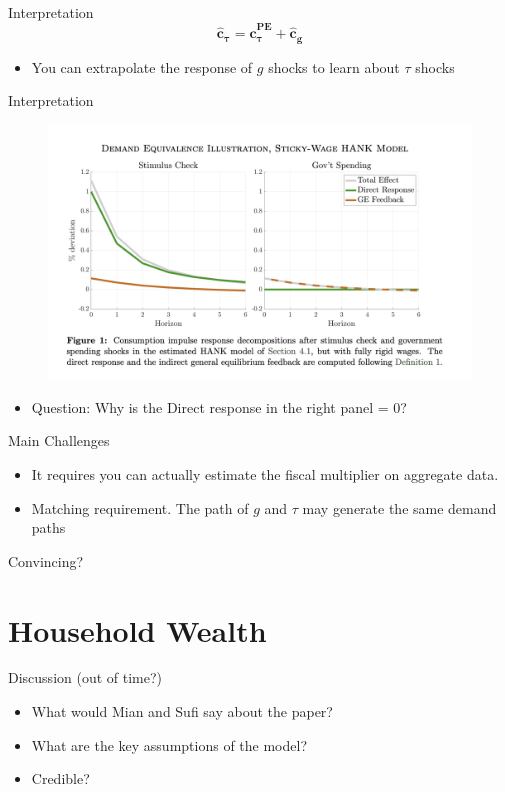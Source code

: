 \documentclass[english,xcolor=svgnames]{beamer}
\begin{document}
\begin{frame}{Interpretation}
$$\mathbf{\hat{c}_{\tau} = \hat{c}^{PE}_{\tau}  + \hat{c}_g} $$
\begin{itemize}
\item You can extrapolate the response of $g$ shocks to learn about $\tau$ shocks
\end{itemize}
\end{frame}

\begin{frame}{Interpretation}
\begin{figure}
\includegraphics[scale=0.45]{figures/wolf_1}
\end{figure}
\begin{itemize}
\item Question: Why is the Direct response in the right panel = 0?
\end{itemize}
\end{frame}

\begin{frame}{Main Challenges}
\begin{itemize}
\item It requires you can actually estimate the fiscal multiplier on aggregate data.
\item Matching requirement. The path of $g$ and $\tau$ may generate the same demand paths
\end{itemize}
\end{frame}

\begin{frame}{Convincing?}

\end{frame}


\section{Household Wealth}

\begin{frame}{Discussion (out of time?)}
\begin{itemize}
\item What would Mian and Sufi say about the paper?
\item What are the key assumptions of the model?
\item Credible?
\end{itemize}
\end{frame}
\end{document}

